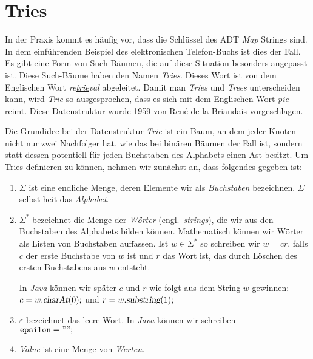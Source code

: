 \section{Tries}
In der Praxis kommt es h\"aufig vor, dass die Schl\"ussel des ADT \textsl{Map} Strings sind.
In dem einf\"uhrenden Beispiel des elektronischen Telefon-Buchs ist dies der Fall.  Es gibt eine
Form von Such-B\"aumen, die auf diese Situation besonders angepasst ist.  Diese Such-B\"aume
haben den Namen \emph{Tries}.  Dieses Wort ist von dem Englischen Wort
\emph{re\underline{trie}val} abgeleitet. Damit man \emph{Tries} und \emph{Trees}
unterscheiden kann, wird \emph{Trie} so ausgesprochen, dass es sich mit dem Englischen
Wort \emph{pie} reimt.  Diese Datenstruktur wurde 1959 von Ren\'e de la Briandais
\cite{briandais:59} vorgeschlagen.


Die Grundidee bei der Datenstruktur \emph{Trie} ist ein Baum, an dem jeder Knoten nicht
nur zwei Nachfolger hat, wie das bei bin\"aren B\"aumen der Fall ist, sondern statt dessen
potentiell f\"ur jeden Buchstaben des Alphabets einen Ast besitzt.  Um Tries definieren zu
k\"onnen, nehmen wir zun\"achst an, dass folgendes gegeben ist:
\begin{enumerate}
\item $\Sigma$ ist eine endliche Menge, deren Elemente wir als \emph{Buchstaben}
      bezeichnen. $\Sigma$ selbst hei\3t das \emph{Alphabet}.
\item $\Sigma^*$ bezeichnet die Menge der \emph{W\"orter} (engl.~\emph{strings}), die wir aus den Buchstaben
      des Alphabets bilden k\"onnen.  Mathematisch k\"onnen wir W\"orter als Listen von 
      Buchstaben auffassen. Ist $w \in \Sigma^*$ so schreiben wir $w = cr$, falls
      $c$ der erste Buchstabe von $w$ ist und $r$ das Wort ist, das durch L\"oschen des
      ersten Buchstabens aus $w$ entsteht.  

      In \textsl{Java} k\"onnen wir sp\"ater $c$ und $r$ wie
      folgt aus dem String $w$ gewinnen: \\[0.2cm]
      \hspace*{1.3cm} $c = w.\textsl{charAt}(0)\mathtt{;}$ 
      \quad und \quad $r = w.\textsl{substring}(1)\mathtt{;}$
\item $\varepsilon$ bezeichnet das leere Wort.  In \textsl{Java} k\"onnen wir schreiben \\[0.2cm]
      \hspace*{1.3cm} $\mathtt{epsilon} = \symbol{34}\symbol{34}\mathtt{;}$ 
\item \textsl{Value} ist eine Menge von \emph{Werten}.  
\end{enumerate}

